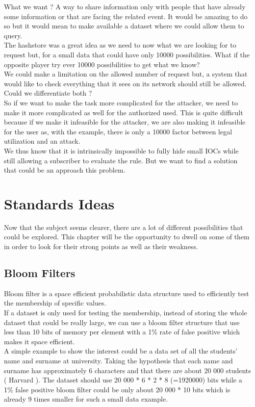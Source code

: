 \documentclass{eplmastersthesis}
\begin{document}
What we want ? A way to share information only with people that have already some information or that are facing the related event. It would be amazing to do so but it would mean to make available a dataset where we could allow them to query.\\
The hashstore was a great idea as we need to now what we are looking for to request but, for a small data that could have only 10000 possibilities. What if the opposite player try ever 10000 possibilities to get what we know? \\
We could make a limitation on the allowed number of request but, a system that would like to check everything that it sees on its network should still be allowed. Could we differentiate both ? \\
So if we want to make the task more complicated for the attacker, we need to make it more complicated as well for the authorized used. This is quite difficult because if we make it infeasible for the attacker, we are also making it infeasible for the user as, with the example, there is only a 10000 factor between legal utilization and an attack.\\

We thus know that it is intrinsically impossible to fully hide small IOCs while still allowing a subscriber to evaluate the rule. But we want to find a solution that could be an approach this problem.



\chapter{Standards Ideas}

Now that the subject seems clearer, there are a lot of different possibilities that could be explored. This chapter will be the opportunity to dwell on some of them in order to look for their strong points as well as their weakness.

\section{Bloom Filters}
Bloom filter is a space efficient probabilistic data structure  used to efficiently test the membership of specific values.\\
If a dataset is only used for testing the membership, instead of storing the whole dataset that could be really large, we can use a bloom filter structure that use less than 10 bits of memory per element with a 1\% rate of false positive which makes it space efficient.\\
A simple example to show the interest could be a data set of all the students' name and surname at university. Taking the hypothesis that each name and surname has approximately 6 characters and that there are about 20 000 students ( Harvard ). The dataset should use 20 000 * 6 * 2 * 8 (=1920000) bits while a 1\% false positive bloom filter could be only about 20 000 * 10 bits which is already 9 times smaller for such a small data example.\\
\end{document}
